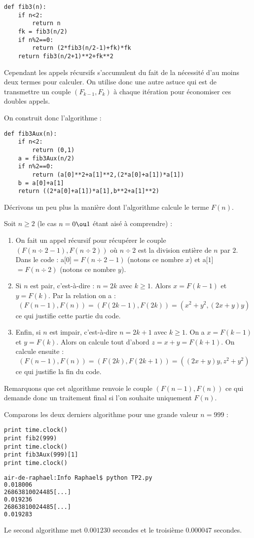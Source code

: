 \documentclass{mybourbaki}
\begin{document}
\begin{lstlisting}[frame = single]
def fib3(n):
	if n<2:
		return n
	fk = fib3(n/2)
	if n%2==0:
		return (2*fib3(n/2-1)+fk)*fk
	return fib3(n/2+1)**2+fk**2	
\end{lstlisting}

Cependant les appels récursifs s'accumulent du fait de la nécessité d'au moins deux termes pour calculer. On utilise donc une autre astuce qui est de transmettre un couple $(F_{k-1},F_k)$ à chaque itération pour économiser ces doubles appels.

On construit donc l'algorithme :
\begin{lstlisting}[frame = single]
def fib3Aux(n):
	if n<2:
		return (0,1)
	a = fib3Aux(n/2)
	if n%2==0:	
		return (a[0]**2+a[1]**2,(2*a[0]+a[1])*a[1])
	b = a[0]+a[1]
	return ((2*a[0]+a[1])*a[1],b**2+a[1]**2)
\end{lstlisting}
Décrivons un peu plus la manière dont l'algorithme calcule le terme $F(n)$.

Soit $n\geq 2$ (le cas $n=0 \ou 1$ étant aisé à comprendre) :
\begin{enumerate}
\item On fait un appel récursif pour récupérer le couple $(F(n\div 2 -1),F(n \div 2))$ où $n \div 2$ est la division entière de $n$ par $2$. Dans le code : a[$0$]$=F(n\div 2 -1)$ (notons ce nombre $x$) et a[$1$]$=F(n\div 2)$ (notons ce nombre $y$).
\item Si $n$ est pair, c'est-à-dire : $n = 2k$ avec $k\geq 1$. Alors $x = F(k-1)$ et $y = F(k)$. Par la relation on a : \[(F(n-1),F(n)) = (F(2k -1),F(2k)) = (x^2 + y^2, (2x+y)y)\]ce qui justifie cette partie du code.
\item Enfin, si $n$ est impair, c'est-à-dire $n=2k+1$ avec $k\geq 1$. On a $x = F(k-1)$ et $y=F(k)$. Alors on calcule tout d'abord $z=x+y = F(k +1)$. On calcule ensuite : \[(F(n-1),F(n)) = (F(2k),F(2k+1)) = ((2x+y)y,z^2+y^2)\]ce qui justifie la fin du code.
\end{enumerate}

Remarquons que cet algorithme renvoie le couple $(F(n-1),F(n))$ ce qui demande donc un traitement final si l'on souhaite uniquement $F(n)$.

Comparons les deux derniers algorithme pour une grande valeur $n=999$ : 
\begin{lstlisting}[frame = single]
print time.clock()
print fib2(999)
print time.clock()
print fib3Aux(999)[1]
print time.clock()	
\end{lstlisting}
\begin{lstlisting}[frame=single,language=bash]
air-de-raphael:Info Raphael$ python TP2.py
0.018006
26863810024485[...]
0.019236
26863810024485[...]
0.019283
\end{lstlisting}
Le second algorithme met $0.001230$ secondes et le troisième $0.000047$ secondes.
\end{document}
